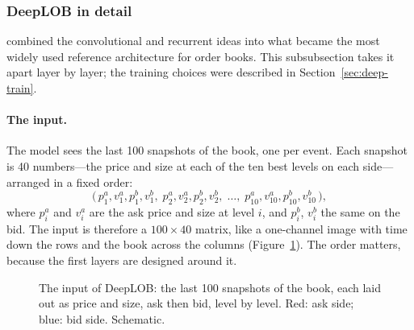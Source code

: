 \subsubsection{DeepLOB in detail}
\label{sec:deeplob}

\citet{zhang2019} combined the convolutional and recurrent ideas into what became the most widely used reference
architecture for order books. This subsubsection takes it apart layer by layer; the training choices were described
in Section~\ref{sec:deep-train}.

\paragraph{The input.} The model sees the last 100 snapshots of the book, one per event. Each snapshot is 40
numbers---the price and size at each of the ten best levels on each side---arranged in a fixed order:
\[
\big(\,p^{a}_1, v^{a}_1, p^{b}_1, v^{b}_1,\; p^{a}_2, v^{a}_2, p^{b}_2, v^{b}_2,\; \dots,\; p^{a}_{10}, v^{a}_{10}, p^{b}_{10}, v^{b}_{10}\,\big),
\]
where $p^{a}_i$ and $v^{a}_i$ are the ask price and size at level $i$, and $p^{b}_i$, $v^{b}_i$ the same on the bid.
The input is therefore a $100 \times 40$ matrix, like a one-channel image with time down the rows and the book
across the columns (Figure~\ref{fig:deeplob-input}). The order matters, because the first layers are designed
around it.

\begin{figure}[!htbp]
\centering
{}
\caption{The input of DeepLOB: the last 100 snapshots of the book, each laid out as price and size, ask then bid,
level by level. Red: ask side; blue: bid side. Schematic.}
\label{fig:deeplob-input}
\end{figure}

